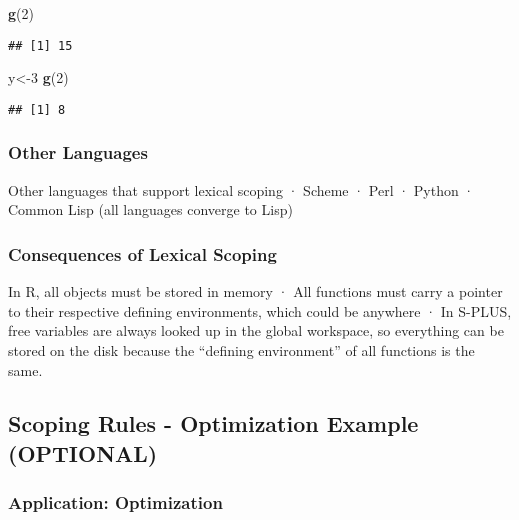 \documentclass[
]{article}
\newenvironment{Shaded}{\begin{snugshade}}{\end{snugshade}}
\newcommand{\DecValTok}[1]{\textcolor[rgb]{0.00,0.00,0.81}{#1}}
\newcommand{\FunctionTok}[1]{\textcolor[rgb]{0.13,0.29,0.53}{\textbf{#1}}}
\newcommand{\NormalTok}[1]{#1}
\newcommand{\OtherTok}[1]{\textcolor[rgb]{0.56,0.35,0.01}{#1}}
\begin{document}
\begin{Shaded}
\begin{Highlighting}[]
\FunctionTok{g}\NormalTok{(}\DecValTok{2}\NormalTok{)}
\end{Highlighting}
\end{Shaded}

\begin{verbatim}
## [1] 15
\end{verbatim}

\begin{Shaded}
\begin{Highlighting}[]
\NormalTok{y}\OtherTok{\textless{}{-}}\DecValTok{3}
\FunctionTok{g}\NormalTok{(}\DecValTok{2}\NormalTok{)}
\end{Highlighting}
\end{Shaded}

\begin{verbatim}
## [1] 8
\end{verbatim}

\hypertarget{other-languages}{%
\subsubsection{Other Languages}\label{other-languages}}

Other languages that support lexical scoping · Scheme · Perl · Python ·
Common Lisp (all languages converge to Lisp)

\hypertarget{consequences-of-lexical-scoping}{%
\subsubsection{Consequences of Lexical
Scoping}\label{consequences-of-lexical-scoping}}

In R, all objects must be stored in memory · All functions must carry a
pointer to their respective defining environments, which could be
anywhere · In S-PLUS, free variables are always looked up in the global
workspace, so everything can be stored on the disk because the
``defining environment'' of all functions is the same.

\hypertarget{scoping-rules---optimization-example-optional}{%
\subsection{Scoping Rules - Optimization Example
(OPTIONAL)}\label{scoping-rules---optimization-example-optional}}

\hypertarget{application-optimization}{%
\subsubsection{Application:
Optimization}\label{application-optimization}}
\end{document}
